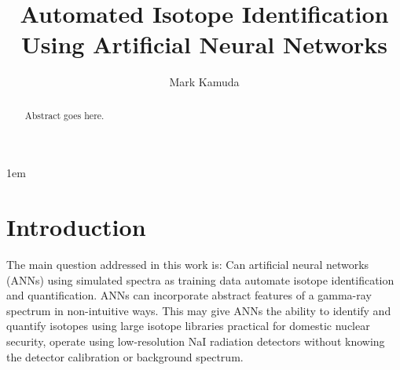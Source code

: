 \documentclass[tocnosub,noragright,centerchapter,12pt,fullpage]{uiucecethesis09}
\title{Automated Isotope Identification Using Artificial Neural Networks}
\author{Mark Kamuda}
\begin{document}
%

%
\maketitle

\parindent 1em%

\frontmatter


\begin{abstract}
Abstract goes here.
\end{abstract}

\tableofcontents

\listoftables

\listoffigures

\mainmatter


\chapter{Introduction}

The main question addressed in this work is: Can artificial neural networks (ANNs) using simulated spectra as training data automate isotope identification and quantification. ANNs can incorporate abstract features of a gamma-ray spectrum in non-intuitive ways. This may give ANNs the ability to identify and quantify isotopes using large isotope libraries practical for domestic nuclear security, operate using low-resolution NaI radiation detectors without knowing the detector calibration or background spectrum.
\end{document}
